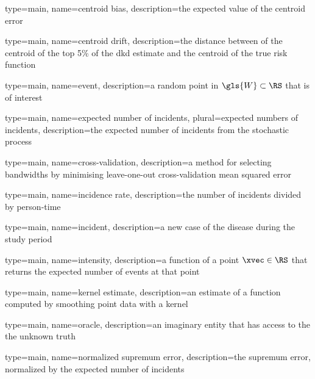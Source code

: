 

{%
   type=main,
   name={centroid bias},
   description={the expected value of the centroid error}
}

{%
   type=main,
   name={centroid drift},
   description={the distance between of the centroid of the top 5\% of the dkd estimate and the centroid of the true risk function}
}

{%
   type=main,
   name={event},
   description={a random point in $\gls{W} \subset \RS$ that is of interest}
}

{%
   type=main,
   name={expected number of incidents},
   plural={expected numbers of incidents},
   description={the expected number of incidents from the stochastic process}
}

{%
   type=main,
   name={cross-validation},
   description={a method for selecting bandwidths by minimising leave-one-out cross-validation mean squared error}
}

{
   type=main,
   name={incidence rate},
   description={the number of incidents divided by person-time}
}

{
   type=main,
   name={incident},
   description={a new case of the disease during the study period}
}

{
   type=main,
   name={intensity},
   description={a function of a point $\xvec \in \RS$ that returns the expected number of events at that point}
}

{
   type=main,
   name={kernel estimate},
   description={an estimate of a function computed by smoothing point data with a kernel}
}

{
   type=main,
   name={oracle},
   description={an imaginary entity that has access to the the unknown truth}
}

{%
   type=main,
   name={normalized supremum error},
   description={the supremum error, normalized by the expected number of incidents}
}

